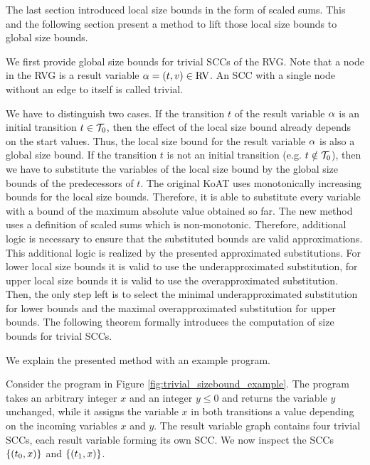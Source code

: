 The last section introduced local size bounds in the form of scaled sums.
This and the following section present a method to lift those local size bounds to global size bounds.

We first provide global size bounds for trivial SCCs of the RVG.
Note that a node in the RVG is a result variable $\alpha = (t,v) \in \text{RV}$.
An SCC with a single node without an edge to itself is called trivial.

We have to distinguish two cases.
If the transition $t$ of the result variable $\alpha$ is an initial transition $t \in \mathcal{T}_0$, then the effect of the local size bound already depends on the start values.
Thus, the local size bound for the result variable $\alpha$ is also a global size bound.
If the transition $t$ is not an initial transition (e.g. $t \notin \mathcal{T}_0$), then we have to substitute the variables of the local size bound by the global size bounds of the predecessors of $t$.
The original KoAT uses monotonically increasing bounds for the local size bounds.
Therefore, it is able to substitute every variable with a bound of the maximum absolute value obtained so far.
The new method uses a definition of scaled sums which is non-monotonic.
Therefore, additional logic is necessary to ensure that the substituted bounds are valid approximations.
This additional logic is realized by the presented approximated substitutions.
For lower local size bounds it is valid to use the underapproximated substitution, for upper local size bounds it is valid to use the overapproximated substitution.
Then, the only step left is to select the minimal underapproximated substitution for lower bounds and the maximal overapproximated substitution for upper bounds.
The following theorem formally introduces the computation of size bounds for trivial SCCs.



We explain the presented method with an example program.



Consider the program in Figure \ref{fig:trivial_sizebound_example}.
The program takes an arbitrary integer $x$ and an integer $y \leq 0$ and returns the variable $y$ unchanged, while it assigns the variable $x$ in both transitions a value depending on the incoming variables $x$ and $y$.
The result variable graph contains four trivial SCCs, each result variable forming its own SCC.
We now inspect the SCCs $\lbrace (t_0,x) \rbrace$ and $\lbrace (t_1,x) \rbrace$.
  
